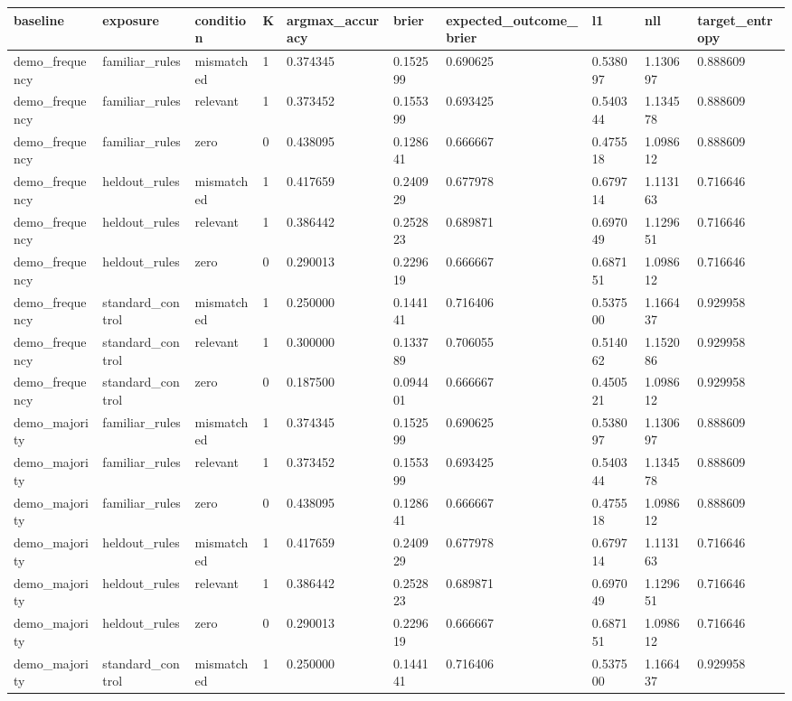 \begin{tabular}{llllllllll}
\hline
baseline & exposure & condition & K & argmax\_accuracy & brier & expected\_outcome\_brier & l1 & nll & target\_entropy \\
\hline
demo\_frequency & familiar\_rules & mismatched & 1 & 0.374345 & 0.152599 & 0.690625 & 0.538097 & 1.130697 & 0.888609 \\
demo\_frequency & familiar\_rules & relevant & 1 & 0.373452 & 0.155399 & 0.693425 & 0.540344 & 1.134578 & 0.888609 \\
demo\_frequency & familiar\_rules & zero & 0 & 0.438095 & 0.128641 & 0.666667 & 0.475518 & 1.098612 & 0.888609 \\
demo\_frequency & heldout\_rules & mismatched & 1 & 0.417659 & 0.240929 & 0.677978 & 0.679714 & 1.113163 & 0.716646 \\
demo\_frequency & heldout\_rules & relevant & 1 & 0.386442 & 0.252823 & 0.689871 & 0.697049 & 1.129651 & 0.716646 \\
demo\_frequency & heldout\_rules & zero & 0 & 0.290013 & 0.229619 & 0.666667 & 0.687151 & 1.098612 & 0.716646 \\
demo\_frequency & standard\_control & mismatched & 1 & 0.250000 & 0.144141 & 0.716406 & 0.537500 & 1.166437 & 0.929958 \\
demo\_frequency & standard\_control & relevant & 1 & 0.300000 & 0.133789 & 0.706055 & 0.514062 & 1.152086 & 0.929958 \\
demo\_frequency & standard\_control & zero & 0 & 0.187500 & 0.094401 & 0.666667 & 0.450521 & 1.098612 & 0.929958 \\
demo\_majority & familiar\_rules & mismatched & 1 & 0.374345 & 0.152599 & 0.690625 & 0.538097 & 1.130697 & 0.888609 \\
demo\_majority & familiar\_rules & relevant & 1 & 0.373452 & 0.155399 & 0.693425 & 0.540344 & 1.134578 & 0.888609 \\
demo\_majority & familiar\_rules & zero & 0 & 0.438095 & 0.128641 & 0.666667 & 0.475518 & 1.098612 & 0.888609 \\
demo\_majority & heldout\_rules & mismatched & 1 & 0.417659 & 0.240929 & 0.677978 & 0.679714 & 1.113163 & 0.716646 \\
demo\_majority & heldout\_rules & relevant & 1 & 0.386442 & 0.252823 & 0.689871 & 0.697049 & 1.129651 & 0.716646 \\
demo\_majority & heldout\_rules & zero & 0 & 0.290013 & 0.229619 & 0.666667 & 0.687151 & 1.098612 & 0.716646 \\
demo\_majority & standard\_control & mismatched & 1 & 0.250000 & 0.144141 & 0.716406 & 0.537500 & 1.166437 & 0.929958 \\

\end{tabular}
